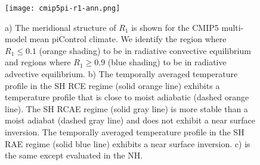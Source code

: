 \documentclass{ametsocV5}
\begin{document}
%

%

\begin{figure}[t]
  \noindent\texttt{[image: cmip5pi-r1-ann.png]}\\
  \caption{a) The meridional structure of \(R_{1}\) is shown for the CMIP5 multi-model mean piControl climate. We identify the region where \(R_{1}\le 0.1\) (orange shading) to be in radiative convective equilibrium and regions where \(R_{1}\ge 0.9\) (blue shading) to be in radiative advective equilibrium. b) The temporally averaged temperature profile in the SH RCE regime (solid orange line) exhibits a temperature profile that is close to moist adiabatic (dashed orange line). The SH RCAE regime (solid gray line) is more stable than a moist adiabat (dashed gray line) and does not exhibit a near surface inversion. The temporally averaged temperature profile in the SH RAE regime (solid blue line) exhibits a near surface inversion. c) is the same except evaluated in the NH.}
  \label{fig:cmip5pi-r1-ann}
\end{figure}
\end{document}
